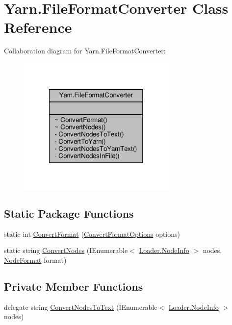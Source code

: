 \hypertarget{a00100}{\section{Yarn.\-File\-Format\-Converter Class Reference}
\label{a00100}
}


Collaboration diagram for Yarn.\-File\-Format\-Converter\-:
\nopagebreak
\begin{figure}[H]
\begin{center}
\leavevmode
\includegraphics[width=222pt]{a00638}
\end{center}
\end{figure}
\subsection*{Static Package Functions}
\begin{DoxyCompactItemize}
\item 
static int \hyperlink{a00100_aa4db4ccac799c5f047a8b1a9efbe109d}{Convert\-Format} (\hyperlink{a00055}{Convert\-Format\-Options} options)
\item 
static string \hyperlink{a00100_a85596df924468279b2dc44a9f31d8bad}{Convert\-Nodes} (I\-Enumerable$<$ \hyperlink{a00131}{Loader.\-Node\-Info} $>$ nodes, \hyperlink{a00048_ad7ebb46e7309ead8767383a672b3272f}{Node\-Format} format)
\end{DoxyCompactItemize}
\subsection*{Private Member Functions}
\begin{DoxyCompactItemize}
\item 
delegate string \hyperlink{a00100_af9bd5d832fdd2bcbdc626d9f8632e05c}{Convert\-Nodes\-To\-Text} (I\-Enumerable$<$ \hyperlink{a00131}{Loader.\-Node\-Info} $>$ nodes)
\end{DoxyCompactItemize}
